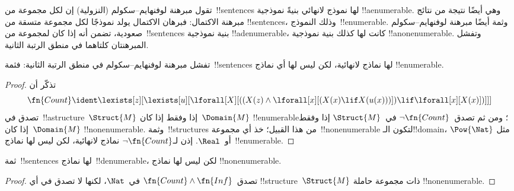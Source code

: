 \documentclass[../../../include/open-logic-section]{subfiles}
\begin{document}


\begin{explain}
تقول مبرهنة لوفنهايم--سكولم (النزولية) إن لكل مجموعة من~!!{sentence}s
لها نموذج لانهائي بنيةً نموذجية !!a{enumerable}. وهي أيضًا نتيجة من
نتائج مبرهنة الاكتمال: فبرهان الاكتمال يولد نموذجًا لكل مجموعة متسقة من
!!{sentence}s، وذلك النموذج~!!{enumerable}. وثمة أيضًا مبرهنة
لوفنهايم--سكولم صعودية، تضمن أنه إذا كان لمجموعة من~!!{sentence}s بنية
نموذجية !!a{denumerable}، كانت لها كذلك بنية نموذجية
!!a{nonenumerable}. وتفشل المبرهنتان كلتاهما في منطق الرتبة الثانية.
\end{explain}

\begin{thm}
 تفشل مبرهنة لوفنهايم--سكولم في منطق الرتبة
الثانية: فثمة~!!{sentence}s لها نماذج لانهائية، لكن ليس لها أي نماذج
!!{enumerable}.
\end{thm}

\begin{proof}
تذكّر أن
\[
\fn{Count} \ident \lexists[z][\lexists[u][\lforall[X][((X(z) \land
      \lforall[x][(X(x) \lif X(u(x)))]) \lif \lforall[x][X(x)])]]]
\]
تصدق في~!!a{structure}~$\Struct{M}$ إذا وفقط إذا كان~$\Domain{M}$
!!{enumerable}؛ ومن ثم تصدق~$\lnot\fn{Count}$ في~$\Struct{M}$ إذا
وفقط إذا كان~$\Domain{M}$ !!{nonenumerable}. وثمة~!!{structure}s من
هذا القبيل؛ خذ أي مجموعة~!!{nonenumerable} لتكون الـ!!{domain}، مثل
$\Pow{\Nat}$ أو~$\Real$. إذن لـ$\lnot \fn{Count}$ نماذج لانهائية، لكن
ليس لها نماذج~!!{enumerable}.
\end{proof}

\begin{thm}
ثمة~!!{sentence}s لها نماذج~!!{denumerable}، لكن ليس لها نماذج
!!{nonenumerable}.
\end{thm}

\begin{proof}
تصدق~$\fn{Count} \land \fn{Inf}$ في~$\Nat$، لكنها لا تصدق في أي
!!{structure}~$\Struct{M}$ ذات مجموعة حاملة
!!{nonenumerable}.
\end{proof}
\end{document}
